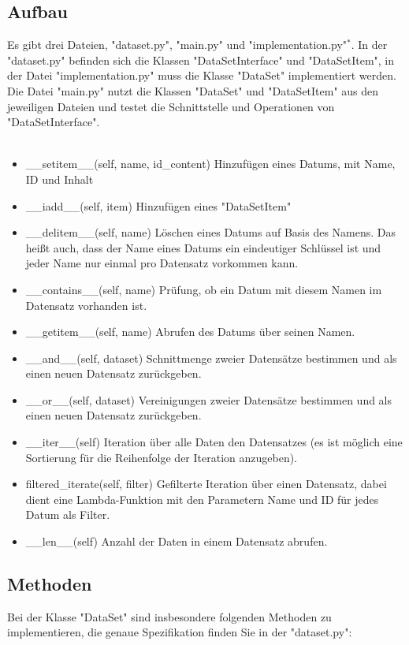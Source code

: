 \documentclass[]{article}
\begin{document}
\subsection{\bf Aufbau \normalfont\\[0.5cm]}
Es gibt drei Dateien, "dataset.py", "main.py" und "implementation.py"$^*$.
In der "dataset.py" befinden sich die Klassen "DataSetInterface" und "DataSetItem",
in der Datei "implementation.py" muss die Klasse "DataSet" implementiert werden.
Die Datei "main.py" nutzt die Klassen "DataSet" und "DataSetItem" aus den jeweiligen Dateien und testet die Schnittstelle und Operationen von "DataSetInterface".\\
\\
\begin{itemize}
    \item \_\_setitem\_\_(self, name, id\_content)
    Hinzufügen eines Datums, mit Name, ID und Inhalt
    \item \_\_iadd\_\_(self, item) Hinzufügen eines "DataSetItem"
    \item \_\_delitem\_\_(self, name) Löschen eines Datums auf Basis des Namens. Das heißt auch, dass der Name eines Datums ein eindeutiger Schlüssel ist und jeder Name nur einmal pro Datensatz vorkommen kann.
    \item \_\_contains\_\_(self, name)
    Prüfung, ob ein Datum mit diesem Namen im Datensatz vorhanden ist.
    \item \_\_getitem\_\_(self, name)
    Abrufen des Datums über seinen Namen.
    \item \_\_and\_\_(self, dataset)
    Schnittmenge zweier Datensätze bestimmen und als einen neuen Datensatz zurückgeben.
    \item \_\_or\_\_(self, dataset)
    Vereinigungen zweier Datensätze bestimmen und als einen neuen Datensatz zurückgeben.
    \item \_\_iter\_\_(self)
    Iteration über alle Daten den Datensatzes (es ist möglich eine Sortierung für die Reihenfolge der Iteration anzugeben).
    \item filtered\_iterate(self, filter)
    Gefilterte Iteration über einen Datensatz, dabei dient eine Lambda-Funktion mit den Parametern Name und ID für jedes Datum als Filter.
    \item \_\_len\_\_(self)
    Anzahl der Daten in einem Datensatz abrufen.
\end{itemize}
\subsection{\bf Methoden \normalfont\\[0.5cm]}
Bei der Klasse "DataSet" sind insbesondere folgenden Methoden zu implementieren, die genaue Spezifikation finden Sie in der "dataset.py":\\
\\
\end{document}
